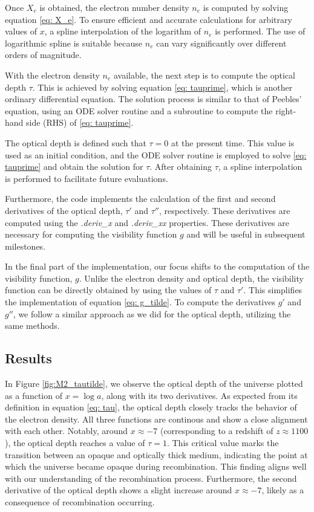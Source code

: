 \documentclass{aa}
\begin{document}
Once $X_e$ is obtained, the electron number density $n_e$ is computed by solving equation \eqref{eq: X_e}. To ensure efficient and accurate calculations for arbitrary values of $x$, a spline interpolation of the logarithm of $n_e$ is performed. The use of logarithmic spline is suitable because $n_e$ can vary significantly over different orders of magnitude.

With the electron density $n_e$ available, the next step is to compute the optical depth $\tau$. This is achieved by solving equation \eqref{eq: tauprime}, which is another ordinary differential equation. The solution process is similar to that of Peebles' equation, using an ODE solver routine and a subroutine to compute the right-hand side (RHS) of \eqref{eq: tauprime}.

The optical depth is defined such that $\tau = 0$ at the present time. This value is used as an initial condition, and the ODE solver routine is employed to solve \eqref{eq: tauprime} and obtain the solution for $\tau$. After obtaining $\tau$, a spline interpolation is performed to facilitate future evaluations.

Furthermore, the code implements the calculation of the first and second derivatives of the optical depth, $\tau'$ and $\tau''$, respectively. These derivatives are computed using the \textit{.deriv\_x} and \textit{.deriv\_xx }properties. These derivatives are necessary for computing the visibility function $g$ and will be useful in subsequent milestones.

In the final part of the implementation, our focus shifts to the computation of the visibility function, $g$. Unlike the electron density and optical depth, the visibility function can be directly obtained by using the values of $\tau$ and $\tau'$. This simplifies the implementation of equation \eqref{eq: g_tilde}. To compute the derivatives $g'$ and $g''$, we follow a similar approach as we did for the optical depth, utilizing the same methods.


\subsection{Results}
In Figure \ref{fig:M2_tautilde}, we observe the optical depth of the universe plotted as a function of $x = \log a$, along with its two derivatives. As expected from its definition in equation \eqref{eq: tau}, the optical depth closely tracks the behavior of the electron density. All three functions are continous and show a close alignment with each other. Notably, around $x \approx -7$ (corresponding to a redshift of $z \approx 1100$), the optical depth reaches a value of $\tau = 1$. This critical value marks the transition between an opaque and optically thick medium, indicating the point at which the universe became opaque during recombination. This finding aligns well with our understanding of the recombination process. Furthermore, the second derivative of the optical depth shows a slight increase around $x \approx -7$, likely as a consequence of recombination occurring.
\end{document}
